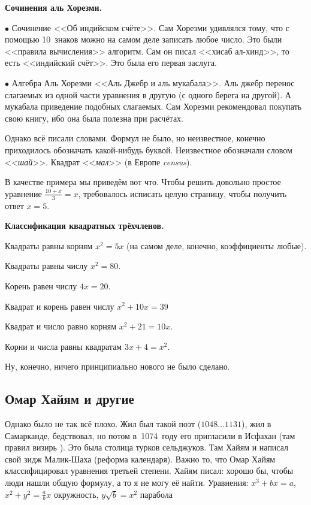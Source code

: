 \documentclass[a4paper,oneside,fleqn,10pt]{article}
\newcommand{\pe}[2]{${#1}\ldots{#2}$}
\begin{document}
\textbf{Сочинения аль Хорезми.}

$\bullet$ Сочинение <<Об индийском счёте>>. Сам Хорезми удивлялся тому, что с помощью 10~знаков
можно на самом деле записать любое число.  Это были <<правила вычисления>> алгоритм.
Сам он писал <<хисаб ал-хинд>>, то есть <<индийский счёт>>. Это была его первая
заслуга.

$\bullet$ Алгебра Аль Хорезми <<Аль Джебр и аль мукабала>>.
Аль джебр перенос слагаемых из одной части уравнения в другую (с одного берега на другой).
А мукабала приведение подобных слагаемых.
Сам Хорезми рекомендовал покупать свою книгу, ибо она была полезна при расчётах.

Однако всё писали словами. Формул не было, но неизвестное, конечно приходилось обозначать
какой-нибудь буквой. Неизвестное обозначали словом <<\emph{шай}>>.
Квадрат <<\emph{мал}>> (в Европе \emph{census}).

В качестве примера мы приведём вот что. Чтобы решить довольно простое уравнение
$\frac{10+x}{3} = x$, требовалось исписать целую страницу,
чтобы получить ответ $x =5$.

\textbf{Классификация квадратных трёхчленов.}

\begin{items}{-2}
\item Квадраты равны корням $x^2 = 5x$ (на самом деле, конечно, коэффициенты любые).
\item Квадраты равны числу $x^2 = 80$.
\item Корень равен числу $4x = 20$.
\item Квадрат и корень равен числу $x^2 + 10x = 39$
\item Квадрат и число равно корням $x^2 + 21 = 10x$.
\item Корни и числа равны квадратам $3x + 4 = x^2$.
\end{items}

Ну, конечно, ничего принципиально нового не было сделано.

\subsection{Омар Хайям и другие}

Однако было не так всё плохо. Жил был такой поэт  (\pe{1048}{1131}),
жил в Самарканде, бедствовал, но потом в~1074~году его пригласили в Исфахан (там правил
визирь ). Это была столица турков сельджуков.
Там Хайям и написал свой зидж Малик-Шаха (реформа календаря).
Важно то, что Омар Хайям классифицировал уравнения третьей степени.
Хайям писал: хорошо бы, чтобы люди нашли общую формулу, а то я не могу её найти.
Уравнения: $x^3 + bx = a$, $x^2 + y^2 = \frac{a}{b} x$ окружность,
$y \sqrt b = x^2$ парабола
\end{document}
